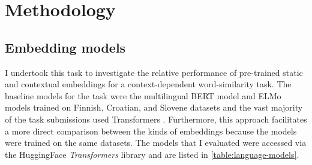 \section{Methodology}
\label{sec:methodology}

\subsection{Embedding models}

I undertook this task to investigate the relative performance of pre-trained static and
contextual embeddings for a context-dependent word-similarity task.
The baseline models for the task were the multilingual BERT model
\parencite{Devlin2019} and ELMo models \parencite{Peters2018a} trained on Finnish,
Croatian, and Slovene datasets \parencite{Ulcar2020a} and the vast majority of the task
submissions used Transformers \parencites{Vaswani2017}[36,42-45]{Armendariz2020a}.
Furthermore, this approach facilitates a more direct comparison between the kinds of
embeddings because the models were trained on the same datasets.
The models that I evaluated were accessed via the HuggingFace \emph{Transformers}
library \parencite{Wolf2020a} and are listed in \cref{table:language-models}.

